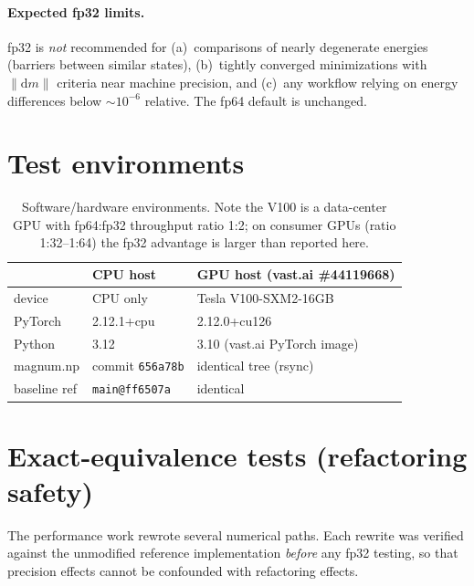 \documentclass[11pt,a4paper]{article}
\newcommand{\magnumnp}{magnum.np}
\begin{document}
\paragraph{Expected fp32 limits.} fp32 is \emph{not} recommended for
(a)~comparisons of nearly degenerate energies (barriers between similar states),
(b)~tightly converged minimizations with $\lVert\mathrm{d}m\rVert$ criteria near
machine precision, and (c)~any workflow relying on energy differences below
$\sim10^{-6}$ relative. The fp64 default is unchanged.

\section{Test environments}
\label{sec:env}

\begin{table}[h]\centering\small
\begin{tabular}{lll}
\toprule
 & CPU host & GPU host (vast.ai \#44119668) \\
\midrule
device & CPU only & Tesla V100-SXM2-16GB \\
PyTorch & 2.12.1+cpu & 2.12.0+cu126 \\
Python & 3.12 & 3.10 (vast.ai PyTorch image) \\
\magnumnp{} & commit \texttt{656a78b} & identical tree (rsync) \\
baseline ref & \texttt{main@ff6507a} & identical \\
\bottomrule
\end{tabular}
\caption{Software/hardware environments. Note the V100 is a data-center GPU with
fp64:fp32 throughput ratio 1:2; on consumer GPUs (ratio 1:32--1:64) the fp32
advantage is larger than reported here.}
\end{table}

\section{Exact-equivalence tests (refactoring safety)}
\label{sec:equiv}

The performance work rewrote several numerical paths. Each rewrite was verified
against the unmodified reference implementation \emph{before} any fp32 testing,
so that precision effects cannot be confounded with refactoring effects.
\end{document}
